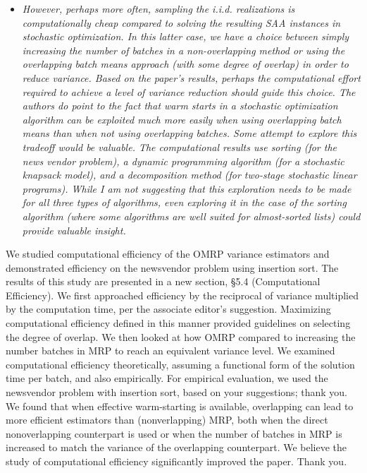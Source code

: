 \documentclass[11pt,notitlepage,onecolumn]{article}
\newcommand{\noi}{\noindent}
\begin{document}
\begin{itemize}
\item[] \textit{However, perhaps more often, sampling the i.i.d. realizations is computationally cheap compared to solving the resulting SAA instances in stochastic optimization. 
In this latter case, we have a choice between simply increasing the number of batches in a non-overlapping method or using the overlapping batch means approach (with some degree of overlap) in order to reduce variance.
Based on the paper's results, perhaps the computational effort required to achieve a level of variance reduction should guide this choice. 
The authors do point to the fact that warm starts in a stochastic
optimization algorithm can be exploited much more easily when using overlapping batch means than when not using overlapping batches. 
Some attempt to explore this tradeoff would be valuable. 
The computational results use sorting (for the news vendor problem), a dynamic programming algorithm (for a stochastic knapsack model), and a decomposition method (for two-stage stochastic linear programs). 
While I am not suggesting that this exploration needs to be made for all three types of algorithms, even exploring it in the case of the sorting algorithm (where some algorithms are well suited for almost-sorted lists) could provide valuable insight.}
\end{itemize}

\noi 
We studied computational efficiency of the OMRP variance estimators and demonstrated efficiency on the newsvendor problem using insertion sort. 
The results of this study are presented in a new section, \S 5.4 (Computational Efficiency).
We first approached efficiency by the reciprocal of variance multiplied by the computation time, per the associate editor's suggestion. 
Maximizing computational efficiency defined in this manner provided guidelines on selecting the degree of overlap. 
We then looked at how OMRP compared to increasing the number batches in MRP to reach an equivalent variance level.
We examined computational efficiency theoretically, assuming a functional form of the solution time per batch, and also empirically. 
For empirical evaluation, we used the newsvendor problem with insertion sort, based on your suggestions; thank you. 
We found that when effective warm-starting is available, overlapping can lead to more efficient estimators than (nonverlapping) MRP, both when the direct nonoverlapping counterpart is used or when the number of batches in MRP is increased to match the variance of the overlapping counterpart.  
We believe the study of computational efficiency significantly improved the paper. 
Thank you.\smallskip 
\end{document}
